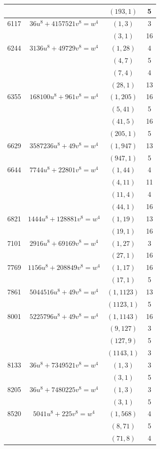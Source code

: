 \documentclass[a4paper,12pt,english,reqno]{amsart}
\begin{document}
\begin{center}
\begin{longtable}{|c|c|c|c|}
&& $(193,1)$ & 5 \\\hline
6117 & $36 u^8+4157521 v^8=w^4$ & $(1,3)$ & 3 \\
&& $(3,1)$ & 16 \\\hline
6244 & $3136  u^8 +49729 v^8=  w^4$ & $(1,28)$ & 4 \\
&& $(4,7)$ & 5 \\
&& $(7,4)$ & 4 \\
&& $(28,1)$ & 13 \\\hline
6355 & $168100 u^8 + 961 v^8=w^4$ & $(1,205)$ & 16 \\
&& $(5,41)$ & 5 \\
&& $(41,5)$ & 16 \\
&& $(205,1)$ & 5 \\\hline
6629 & $3587236 u^8+49 v^8=w^4$ & $(1,947)$ & 13 \\
&& $(947,1)$ & 5 \\\hline
6644 & $ 7744u^8 + 22801 v^8 =w^4$ & $(1,44)$ & 4 \\
&& $(4,11)$ & 11 \\
&& $(11,4)$ & 4 \\
&& $(44,1)$ & 16 \\\hline
6821 & $1444 u^8+ 128881 v^8= w^4$ & $(1,19)$ & 13 \\
&& $(19,1)$ & 16 \\\hline
7101 & $ 2916u^8 + 69169 v^8= w^4$ & $(1,27)$ & 3 \\
&& $(27,1)$ & 16 \\\hline
7769 & $1156 u^8 + 208849 v^8= w^4$ & $(1,17)$ & 16 \\
&& $(17,1)$ & 5 \\\hline
7861 & $5044516 u^8+49 v^8= w^4$ & $(1,1123)$ & 13 \\
&& $(1123,1)$ & 5 \\\hline
8001 & $5225796 u^8 + 49 v^8= w^4$ & $(1,1143)$ & 16 \\
&& $(9,127)$ & 3 \\
&& $(127,9)$ & 5 \\
&& $(1143,1)$ & 3 \\\hline
8133 & $36u^8 +7349521   v^8=w^4$ & $(1,3)$ & 3 \\
&& $(3,1)$ & 5 \\\hline
8205 & $36u^8+7480225v^8=w^4$ & $(1,3)$ & 3 \\
&& $(3,1)$ & 5 \\\hline
8520 & $5041 u^8 + 225 v^8=  w^4$ & $(1,568)$ & 4 \\
&& $(8,71)$ & 5 \\
&& $(71,8)$ & 4 \\

\end{longtable}
\end{center}
\end{document}

